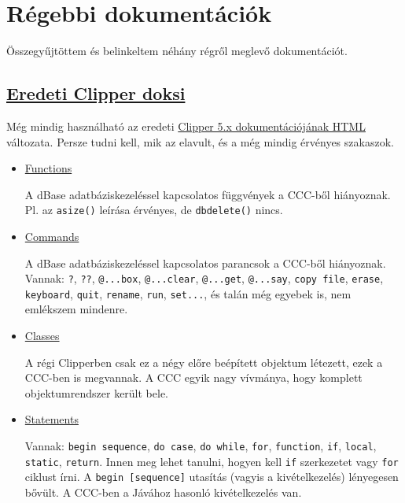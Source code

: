 
\section{Régebbi dokumentációk}

Összegyűjtöttem és belinkeltem néhány régről meglevő dokumentációt.

\subsection{
\protect\href{http://ccc.comfirm.hu/pub/ng}{Eredeti Clipper doksi}
}

Még mindig használható az eredeti
\href{http://ccc.comfirm.hu/pub/ng}{
 Clipper 5.x dokumentációjának HTML} változata.
Persze tudni kell, mik az elavult, és a még mindig érvényes
szakaszok. 
\begin{itemize}
\item \href{http://ccc.comfirm.hu/pub/ng/Clipper-guide/ng3ca.html}{Functions}
    \par
    A dBase adatbáziskezeléssel kapcsolatos függvények a CCC-ből hiányoznak.
    Pl. az \verb!asize()! leírása érvényes, de \verb!dbdelete()! nincs.

\item \href{http://ccc.comfirm.hu/pub/ng/Clipper-guide/ng6fdf7.html}{Commands}
    \par
    A dBase adatbáziskezeléssel kapcsolatos parancsok a CCC-ből hiányoznak.
    Vannak:
    \verb!?!, 
    \verb!??!, 
    \verb!@...box!, 
    \verb!@...clear!, 
    \verb!@...get!, 
    \verb!@...say!, 
    \verb!copy file!, 
    \verb!erase!, 
    \verb!keyboard!, 
    \verb!quit!, 
    \verb!rename!, 
    \verb!run!, 
    \verb!set...!, és talán még egyebek is, nem emlékszem mindenre.

\item \href{http://ccc.comfirm.hu/pub/ng/Clipper-guide/ngb495e.html}{Classes}
    \par
    A régi Clipperben csak ez a négy előre beépített objektum létezett,
    ezek a CCC-ben is megvannak. A CCC egyik nagy vívmánya, hogy komplett 
    objektumrendszer került bele. 

\item \href{http://ccc.comfirm.hu/pub/ng/Clipper-guide/ngb4a83.html}{Statements}
    \par
    Vannak:
    \verb!begin sequence!,
    \verb!do case!,
    \verb!do while!,
    \verb!for!,
    \verb!function!,
    \verb!if!,
    \verb!local!,
    \verb!static!,
    \verb!return!.
    Innen meg lehet tanulni, hogyen kell \verb!if! szerkezetet 
    vagy \verb!for! ciklust írni. A \verb!begin [sequence]! utasítás
    (vagyis a kivételkezelés) lényegesen bővült. A CCC-ben a Jávához
    hasonló kivételkezelés van.


\end{itemize}
